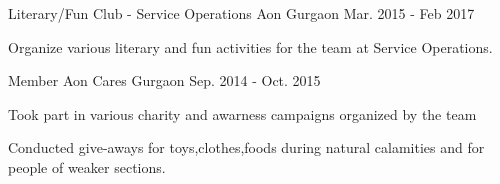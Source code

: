 

\begin{cventries}

  \cventry
    {Literary/Fun Club - Service Operations} %
    {Aon} %
    {Gurgaon} %
    {Mar. 2015 - Feb 2017} %
    {
      \begin{cvitems} %
        \item {Organize various literary and fun activities for the team at Service Operations.}
      \end{cvitems}
    }

  \cventry
    {Member} %
    {Aon Cares} %
    {Gurgaon} %
    {Sep. 2014 - Oct. 2015} %
    {
      \begin{cvitems} %
        \item {Took part in various charity and awarness campaigns organized by the team}
        \item {Conducted give-aways for toys,clothes,foods during natural calamities and for people of weaker sections.}
      \end{cvitems}
    }

\end{cventries}
